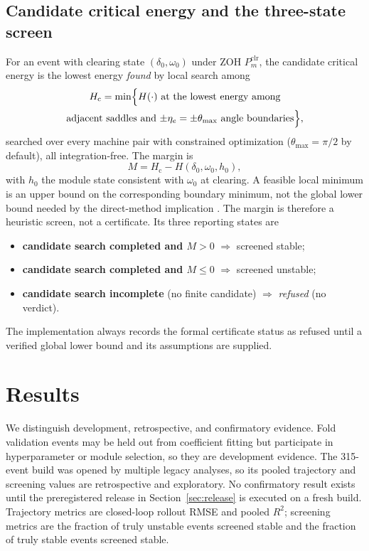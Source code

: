 \documentclass[journal]{IEEEtran}
\begin{document}
\subsection{Candidate critical energy and the three-state screen}
\label{sec:margin}
For an event with clearing state $(\delta_0,\omega_0)$ under ZOH $P_m^{\mathrm
{clr}}$, the candidate critical energy is the lowest energy \emph{found} by
local search among
\begin{multline}
H_{\mathrm c}=\min\Bigl\{ H(\cdot)\ \text{at the lowest energy among}\\
\text{adjacent saddles and $\pm\eta_e=\pm\theta_{\max}$ angle boundaries}\Bigr\},
\label{eq:critical}
\end{multline}
searched over every machine pair with constrained optimization
($\theta_{\max}=\pi/2$ by default), all integration-free. The margin is
\begin{equation}
M = H_{\mathrm c} - H(\delta_0,\omega_0,h_0),
\label{eq:margin}
\end{equation}
with $h_0$ the module state consistent with $\omega_0$ at clearing. A feasible
local minimum is an upper bound on the corresponding boundary minimum, not the
global lower bound needed by the direct-method implication
\cite{chiang1987foundations,chiang1994bcu}. The margin is therefore a heuristic
screen, not a certificate. Its three reporting states are
\begin{itemize}
\item \textbf{candidate search completed and $M>0$} $\Rightarrow$ screened stable;
\item \textbf{candidate search completed and $M\leq 0$} $\Rightarrow$ screened unstable;
\item \textbf{candidate search incomplete} (no finite candidate) $\Rightarrow$
      \emph{refused} (no verdict).
\end{itemize}
The implementation always records the formal certificate status as refused
until a verified global lower bound and its assumptions are supplied.

\section{Results}
\label{sec:results}

We distinguish development, retrospective, and confirmatory evidence. Fold
validation events may be held out from coefficient fitting but participate in
hyperparameter or module selection, so they are development evidence. The
315-event build was opened by multiple legacy analyses, so its pooled trajectory
and screening values are retrospective and exploratory. No confirmatory result
exists until the preregistered release in Section~\ref{sec:release} is executed
on a fresh build. Trajectory metrics are closed-loop rollout RMSE and pooled
$R^2$; screening metrics are the fraction of truly unstable events screened
stable and the fraction of truly stable events screened stable.
\end{document}
